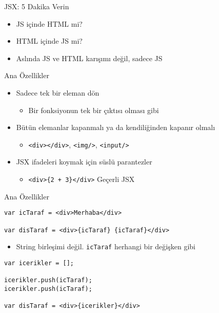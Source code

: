 \documentclass[presentation]{beamer}
\begin{document}
\begin{frame}[label={sec:org2e8a22e}]{JSX: 5 Dakika Verin}
\begin{itemize}
\item JS içinde HTML mi?
\item HTML içinde JS mi?
\item Aslında JS ve HTML karışımı değil, sadece JS
\end{itemize}
\end{frame}

\begin{frame}[fragile,label={sec:org7397930}]{Ana Özellikler}
 \begin{itemize}
\item Sadece tek bir eleman dön
\begin{itemize}
\item Bir fonksiyonun tek bir çıktısı olması gibi
\end{itemize}
\item Bütün elemanlar kapanmalı ya da kendiliğinden kapanır olmalı
\begin{itemize}
\item \texttt{<div></div>}, \texttt{<img/>}, \texttt{<input/>}
\end{itemize}
\item JSX ifadeleri koymak için süslü parantezler
\begin{itemize}
\item \texttt{<div>\{2 + 3\}</div>} Geçerli JSX
\end{itemize}
\end{itemize}
\end{frame}

\begin{frame}[fragile,label={sec:org5cbd744}]{Ana Özellikler}
 \begin{verbatim}
var icTaraf = <div>Merhaba</div>

var disTaraf = <div>{icTaraf} {icTaraf}</div>
\end{verbatim}
\begin{itemize}
\item String birleşimi değil. \texttt{icTaraf} herhangi bir değişken gibi
\end{itemize}
\begin{verbatim}
var icerikler = [];

icerikler.push(icTaraf);
icerikler.push(icTaraf);

var disTaraf = <div>{icerikler}</div>
\end{verbatim}
\end{frame}
\end{document}
